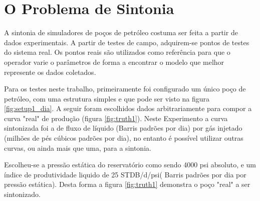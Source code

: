 
\chapter{O Problema de Sintonia} \label{chap:conc}
	

A sintonia de simuladores de poços de petróleo costuma ser feita a partir de dados experimentais. 
%
A partir de testes de campo, adquirem-se pontos de testes do sistema real.
%
Os pontos reais são utilizados como referência para que o operador varie o parâmetros de forma a encontrar o modelo que melhor represente os dados coletados.
%

Para os testes neste trabalho, primeiramente foi configurado um único poço de petróleo, com uma estrutura simples e que pode ser visto na figura \ref{fig:setup1_dia}.
% 
A seguir foram escolhidos dados arbitrariamente para compor a curva "real" de produção (figura \ref{fig:truth1}).
%
Neste Experimento a curva sintonizada foi a de fluxo de líquido (Barris padrões por dia) por gás injetado (milhões de pés cúbicos padrões por dia), no entanto é possível utilizar outras curvas, ou ainda mais que uma, para a sintonia.
%

Escolheu-se a pressão estática do reservatório como sendo 4000 psi absoluto, e um índice de produtividade liquido de 25 STDB/d/psi( Barris padrões por dia por pressão estática). 
%
Desta forma a figura \ref{fig:truth1} demonstra o poço "real" a ser sintonizado.



